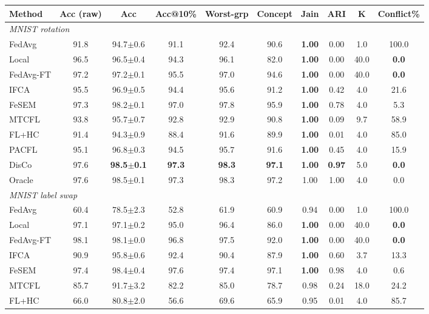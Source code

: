 \scriptsize
\setlength{\tabcolsep}{3.2pt}
\begin{tabular}{lccccccccc}
\toprule
Method & Acc (raw) & Acc & Acc@10\% & Worst-grp & Concept & Jain & ARI & K & Conflict\% \\
\midrule
\multicolumn{10}{l}{\textit{MNIST rotation}}\\
FedAvg & 91.8 & 94.7$\pm$0.6 & 91.1 & 92.4 & 90.6 & \textbf{1.00} & 0.00 & 1.0 & 100.0 \\
Local & 96.5 & 96.5$\pm$0.4 & 94.3 & 96.1 & 82.0 & \textbf{1.00} & 0.00 & 40.0 & \textbf{0.0} \\
FedAvg-FT & 97.2 & 97.2$\pm$0.1 & 95.5 & 97.0 & 94.6 & \textbf{1.00} & 0.00 & 40.0 & \textbf{0.0} \\
IFCA & 95.5 & 96.9$\pm$0.5 & 94.4 & 95.6 & 91.2 & \textbf{1.00} & 0.42 & 4.0 & 21.6 \\
FeSEM & 97.3 & 98.2$\pm$0.1 & 97.0 & 97.8 & 95.9 & \textbf{1.00} & 0.78 & 4.0 & 5.3 \\
MTCFL & 93.8 & 95.7$\pm$0.7 & 92.8 & 92.9 & 90.8 & \textbf{1.00} & 0.09 & 9.7 & 58.9 \\
FL+HC & 91.4 & 94.3$\pm$0.9 & 88.4 & 91.6 & 89.9 & \textbf{1.00} & 0.01 & 4.0 & 85.0 \\
PACFL & 95.1 & 96.8$\pm$0.3 & 94.5 & 95.7 & 91.6 & \textbf{1.00} & 0.45 & 4.0 & 15.9 \\
DisCo & 97.6 & \textbf{98.5$\pm$0.1} & \textbf{97.3} & \textbf{98.3} & \textbf{97.1} & \textbf{1.00} & \textbf{0.97} & 5.0 & \textbf{0.0} \\
Oracle & 97.6 & 98.5$\pm$0.1 & 97.3 & 98.3 & 97.2 & 1.00 & 1.00 & 4.0 & 0.0 \\
\midrule
\multicolumn{10}{l}{\textit{MNIST label swap}}\\
FedAvg & 60.4 & 78.5$\pm$2.3 & 52.8 & 61.9 & 60.9 & 0.94 & 0.00 & 1.0 & 100.0 \\
Local & 97.1 & 97.1$\pm$0.2 & 95.0 & 96.4 & 86.0 & \textbf{1.00} & 0.00 & 40.0 & \textbf{0.0} \\
FedAvg-FT & 98.1 & 98.1$\pm$0.0 & 96.8 & 97.5 & 92.0 & \textbf{1.00} & 0.00 & 40.0 & \textbf{0.0} \\
IFCA & 90.9 & 95.8$\pm$0.6 & 92.4 & 90.4 & 87.9 & \textbf{1.00} & 0.60 & 3.7 & 13.3 \\
FeSEM & 97.4 & 98.4$\pm$0.4 & 97.6 & 97.4 & 97.1 & \textbf{1.00} & 0.98 & 4.0 & 0.6 \\
MTCFL & 85.7 & 91.7$\pm$3.2 & 82.2 & 85.0 & 78.7 & 0.98 & 0.24 & 18.0 & 24.2 \\
FL+HC & 66.0 & 80.8$\pm$2.0 & 56.6 & 69.6 & 65.9 & 0.95 & 0.01 & 4.0 & 85.7 \\

\end{tabular}
